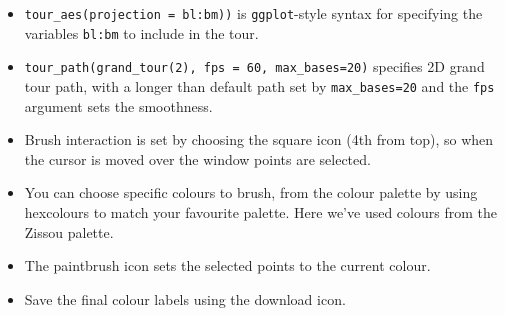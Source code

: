 \documentclass[
  letterpaper,
]{krantz}
\providecommand{\tightlist}{%
  \setlength{\itemsep}{0pt}\setlength{\parskip}{0pt}}\usepackage{longtable,booktabs,array}
\begin{document}
\begin{itemize}
\tightlist
\item
  \texttt{tour\_aes(projection\ =\ bl:bm))} is \texttt{ggplot}-style
  syntax for specifying the variables \texttt{bl:bm} to include in the
  tour.
\item
  \texttt{tour\_path(grand\_tour(2),\ fps\ =\ 60,\ max\_bases=20)}
  specifies 2D grand tour path, with a longer than default path set by
  \texttt{max\_bases=20} and the \texttt{fps} argument sets the
  smoothness.
\item
  Brush interaction is set by choosing the square icon (4th from top),
  so when the cursor is moved over the window points are selected.
\item
  You can choose specific colours to brush, from the colour palette by
  using hexcolours to match your favourite palette. Here we've used
  colours from the Zissou palette.
\item
  The paintbrush icon sets the selected points to the current colour.
\item
  Save the final colour labels using the download icon.
\end{itemize}
\end{document}
